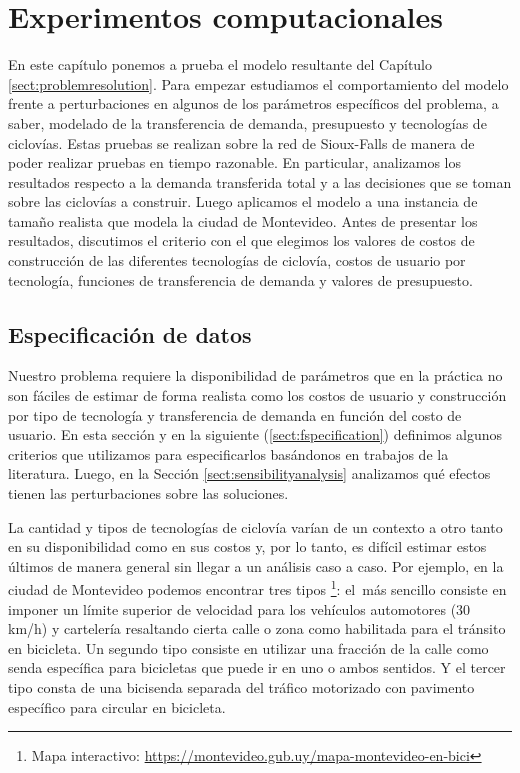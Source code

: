 \chapter{Experimentos computacionales}
\label{sect:problemresults}

En este capítulo ponemos a prueba el modelo resultante del Capítulo \ref{sect:problemresolution}. Para empezar estudiamos el comportamiento del modelo frente a perturbaciones en algunos de los parámetros específicos del problema, a saber, modelado de la transferencia de demanda, presupuesto y tecnologías de ciclovías. Estas pruebas se realizan sobre la red de Sioux-Falls de manera de poder realizar pruebas en tiempo razonable. En particular, analizamos los resultados respecto a la demanda transferida total y a las decisiones que se toman sobre las ciclovías a construir. Luego aplicamos el modelo a una instancia de tamaño realista que modela la ciudad de Montevideo. Antes de presentar los resultados, discutimos el criterio con el que elegimos los valores de costos de construcción de las diferentes tecnologías de ciclovía, costos de usuario por tecnología, funciones de transferencia de demanda y valores de presupuesto.

\section{Especificación de datos}
\label{sect:dataspecification}

Nuestro problema requiere la disponibilidad de parámetros que en la práctica no son fáciles de estimar de forma realista como los costos de usuario y construcción por tipo de tecnología y transferencia de demanda en función del costo de usuario. En esta sección y en la siguiente (\ref{sect:fspecification}) definimos algunos criterios que utilizamos para especificarlos basándonos en trabajos de la literatura. Luego, en la Sección \ref{sect:sensibilityanalysis} analizamos qué efectos tienen las perturbaciones sobre las soluciones.

La cantidad y tipos de tecnologías de ciclovía varían de un contexto a otro tanto en su disponibilidad como en sus costos y, por lo tanto, es difícil estimar estos últimos de manera general sin llegar a un análisis caso a caso. Por ejemplo, en la ciudad de Montevideo podemos encontrar tres tipos \footnote{Mapa interactivo: \url{https://montevideo.gub.uy/mapa-montevideo-en-bici}}: el más sencillo consiste en imponer un límite superior de velocidad para los vehículos automotores (30 km/h) y cartelería resaltando cierta calle o zona como habilitada para el tránsito en bicicleta. Un segundo tipo consiste en utilizar una fracción de la calle como senda específica para bicicletas que puede ir en uno o ambos sentidos. Y el tercer tipo consta de una bicisenda separada del tráfico motorizado con pavimento específico para circular en bicicleta.

